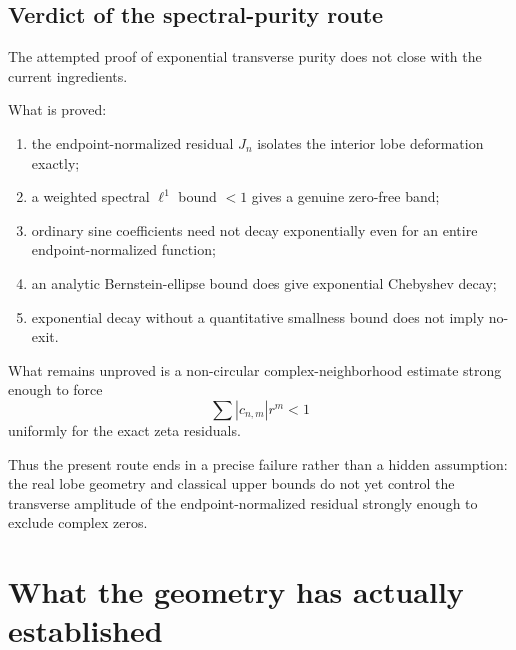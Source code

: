 \documentclass[11pt]{article}
\theoremstyle{definition}
\begin{document}
\subsection{Verdict of the spectral-purity route}

The attempted proof of exponential transverse purity does not close with the
current ingredients.

What is proved:
\begin{enumerate}[leftmargin=1.8em]
\item the endpoint-normalized residual $J_n$ isolates the interior lobe
deformation exactly;
\item a weighted spectral $\ell^1$ bound $<1$ gives a genuine zero-free
band;
\item ordinary sine coefficients need not decay exponentially even for an
entire endpoint-normalized function;
\item an analytic Bernstein-ellipse bound does give exponential Chebyshev
decay;
\item exponential decay without a quantitative smallness bound does not
imply no-exit.
\end{enumerate}

What remains unproved is a non-circular complex-neighborhood estimate strong
enough to force
\[
\sum |c_{n,m}|r^m<1
\]
uniformly for the exact zeta residuals.

Thus the present route ends in a precise failure rather than a hidden
assumption: the real lobe geometry and classical upper bounds do not yet
control the transverse amplitude of the endpoint-normalized residual
strongly enough to exclude complex zeros.


\section{What the geometry has actually established}
\end{document}
